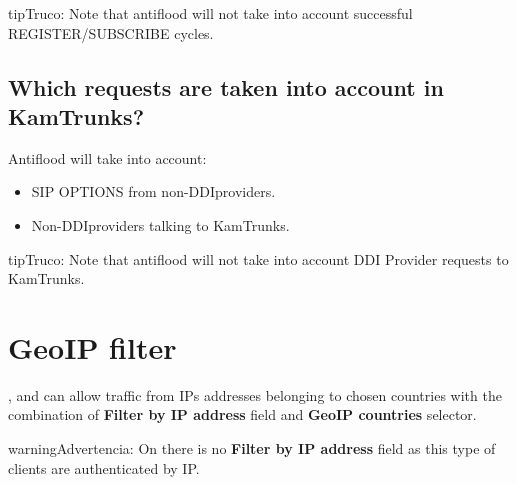 \documentclass[letterpaper,10pt,spanish]{sphinxmanual}
\begin{document}
\begin{notice}{tip}{Truco:}
Note that antiflood will not take into account successful REGISTER/SUBSCRIBE cycles.
\end{notice}


\subsection{Which requests are taken into account in KamTrunks?}
\label{security_and_maintenance/security/antiflooding:which-requests-are-taken-into-account-in-kamtrunks}
Antiflood will take into account:
\begin{itemize}
\item {} 
SIP OPTIONS from non-DDIproviders.

\item {} 
Non-DDIproviders talking to KamTrunks.

\end{itemize}

\begin{notice}{tip}{Truco:}
Note that antiflood will not take into account DDI Provider requests to KamTrunks.
\end{notice}


\section{GeoIP filter}
\label{security_and_maintenance/security/geoip_filter:geoip-filter}\label{security_and_maintenance/security/geoip_filter::doc}\label{security_and_maintenance/security/geoip_filter:id1}
{\hyperref[administration_portal/client/vpbx/index:vpbx\string-clients]{}}, {\hyperref[administration_portal/client/retail/index:retail\string-clients]{}} and {\hyperref[administration_portal/client/residential/index:residential\string-clients]{}} can allow traffic from
IPs addresses belonging to chosen countries with the combination of \textbf{Filter by IP address} field and \textbf{GeoIP countries} selector.

\begin{notice}{warning}{Advertencia:}
On {\hyperref[administration_portal/client/wholesale/index:wholesale\string-clients]{}} there is no \textbf{Filter by IP address} field as this type of clients are authenticated by IP.
\end{notice}
\end{document}
